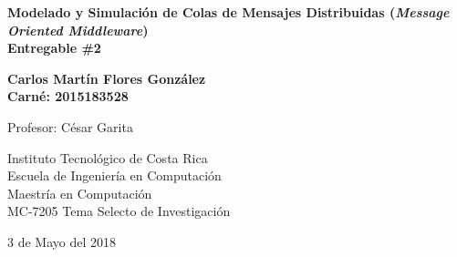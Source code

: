 \documentclass[11pt, twoside]{report}
\begin{document}
  
 


\begin{titlepage}
    \begin{center}
        \vspace*{1cm}
        
        \Large
        \textbf{Modelado y Simulación de Colas de Mensajes Distribuidas (\emph{Message Oriented Middleware})\\ Entregable \#2}
        
        \vspace{1.5cm}
        
        \textbf{Carlos Martín Flores González\\ \textnormal{\small{Carné: 2015183528}}}
        
        \vfill
        
        Profesor: César Garita
        
        
        
        \Large
        Instituto Tecnológico de Costa Rica\\
        Escuela de Ingeniería en Computación\\
        Maestría en Computación\\
        MC-7205 Tema Selecto de Investigación
        
        \vfill
        
        3 de Mayo del 2018
        
        
        
    \end{center}
\end{titlepage}





\setcounter{page}{1}
\tableofcontents
\clearpage

%







{}
\end{document}
